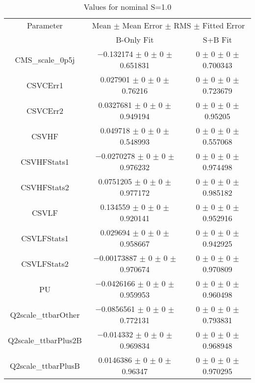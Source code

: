 \begin{table}
\centering
\caption{Values for nominal S=1.0}
\begin{tabular}{ccc}
\toprule
Parameter & \multicolumn{2}{c}{Mean $\pm$ Mean Error $\pm$ RMS $\pm$ Fitted Error}\\
 & B-Only Fit & S+B Fit\\
\midrule
CMS\_scale\_0p5j & \num{-0.132174} $\pm$ \num{0} $\pm$ \num{0} $\pm$ \num{0.651831} & \num{0} $\pm$ \num{0} $\pm$ \num{0} $\pm$ \num{0.700343}\\
CSVCErr1 & \num{0.027901} $\pm$ \num{0} $\pm$ \num{0} $\pm$ \num{0.76216} & \num{0} $\pm$ \num{0} $\pm$ \num{0} $\pm$ \num{0.723679}\\
CSVCErr2 & \num{0.0327681} $\pm$ \num{0} $\pm$ \num{0} $\pm$ \num{0.949194} & \num{0} $\pm$ \num{0} $\pm$ \num{0} $\pm$ \num{0.95205}\\
CSVHF & \num{0.049718} $\pm$ \num{0} $\pm$ \num{0} $\pm$ \num{0.548993} & \num{0} $\pm$ \num{0} $\pm$ \num{0} $\pm$ \num{0.557068}\\
CSVHFStats1 & \num{-0.0270278} $\pm$ \num{0} $\pm$ \num{0} $\pm$ \num{0.976232} & \num{0} $\pm$ \num{0} $\pm$ \num{0} $\pm$ \num{0.974498}\\
CSVHFStats2 & \num{0.0751205} $\pm$ \num{0} $\pm$ \num{0} $\pm$ \num{0.977172} & \num{0} $\pm$ \num{0} $\pm$ \num{0} $\pm$ \num{0.985182}\\
CSVLF & \num{0.134559} $\pm$ \num{0} $\pm$ \num{0} $\pm$ \num{0.920141} & \num{0} $\pm$ \num{0} $\pm$ \num{0} $\pm$ \num{0.952916}\\
CSVLFStats1 & \num{0.029694} $\pm$ \num{0} $\pm$ \num{0} $\pm$ \num{0.958667} & \num{0} $\pm$ \num{0} $\pm$ \num{0} $\pm$ \num{0.942925}\\
CSVLFStats2 & \num{-0.00173887} $\pm$ \num{0} $\pm$ \num{0} $\pm$ \num{0.970674} & \num{0} $\pm$ \num{0} $\pm$ \num{0} $\pm$ \num{0.970809}\\
PU & \num{-0.0426166} $\pm$ \num{0} $\pm$ \num{0} $\pm$ \num{0.959953} & \num{0} $\pm$ \num{0} $\pm$ \num{0} $\pm$ \num{0.960498}\\
Q2scale\_ttbarOther & \num{-0.0856561} $\pm$ \num{0} $\pm$ \num{0} $\pm$ \num{0.772131} & \num{0} $\pm$ \num{0} $\pm$ \num{0} $\pm$ \num{0.793831}\\
Q2scale\_ttbarPlus2B & \num{-0.014332} $\pm$ \num{0} $\pm$ \num{0} $\pm$ \num{0.969834} & \num{0} $\pm$ \num{0} $\pm$ \num{0} $\pm$ \num{0.968948}\\
Q2scale\_ttbarPlusB & \num{0.0146386} $\pm$ \num{0} $\pm$ \num{0} $\pm$ \num{0.96347} & \num{0} $\pm$ \num{0} $\pm$ \num{0} $\pm$ \num{0.970295}\\

\end{tabular}
\end{table}
